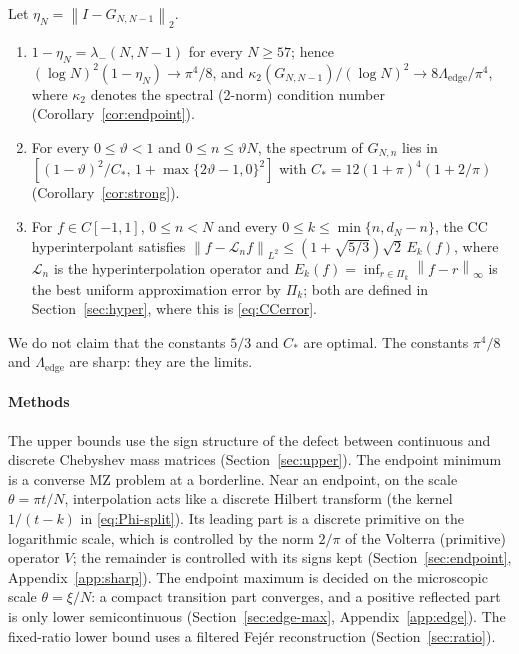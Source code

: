 \documentclass{siamart251216}
\newcommand{\Pn}{\Pi}
\newcommand{\norm}[1]{\left\lVert#1\right\rVert}
\begin{document}
\begin{corollary}\label{cor:intro}
Let $\eta_N=\norm{I-G_{N,N-1}}_2$.
\begin{enumerate}
\item $1-\eta_N=\lambda_-(N,N-1)$ for every $N\ge57$; hence
$(\log N)^2(1-\eta_N)\to\pi^4/8$, and
$\kappa_2(G_{N,N-1})/(\log N)^2\to8\Lambda_{\mathrm{edge}}/\pi^4$,
where $\kappa_2$ denotes the spectral (2-norm) condition number
(Corollary~\ref{cor:endpoint}).
\item For every $0\le\vartheta<1$ and $0\le n\le\vartheta N$, the spectrum of
$G_{N,n}$ lies in $[(1-\vartheta)^2/C_*,\,1+\max\{2\vartheta-1,0\}^2]$ with
$C_*=12(1+\pi)^4(1+2/\pi)$ (Corollary~\ref{cor:strong}).
\item For $f\in C[-1,1]$, $0\le n<N$ and every $0\le k\le\min\{n,d_N-n\}$,
the CC hyperinterpolant satisfies
$\norm{f-\mathcal L_nf}_{L^2}\le(1+\sqrt{5/3})\sqrt2\,E_k(f)$, where
$\mathcal L_n$ is the hyperinterpolation operator and
$E_k(f)=\inf_{r\in\Pn_k}\norm{f-r}_\infty$ is the best uniform
approximation error by $\Pn_k$; both are defined in
Section~\ref{sec:hyper}, where this is \eqref{eq:CCerror}.
\end{enumerate}
\end{corollary}

We do not claim that the constants $5/3$ and $C_*$ are optimal. The
constants $\pi^4/8$ and $\Lambda_{\mathrm{edge}}$ are sharp: they are the
limits.

\paragraph{Methods}
The upper bounds use the sign structure of the defect between continuous and
discrete Chebyshev mass matrices (Section~\ref{sec:upper}). The endpoint
minimum is a converse MZ problem at a borderline. Near an endpoint, on the
scale $\theta=\pi t/N$, interpolation acts like a discrete Hilbert transform
(the kernel $1/(t-k)$ in \eqref{eq:Phi-split}).
Its leading part is a discrete primitive on the logarithmic scale, which is
controlled by the norm $2/\pi$ of the Volterra (primitive) operator $V$; the remainder is
controlled with its signs kept (Section~\ref{sec:endpoint},
Appendix~\ref{app:sharp}). The endpoint maximum is decided on the microscopic
scale $\theta=\xi/N$: a compact transition part converges, and a positive
reflected part is only lower semicontinuous (Section~\ref{sec:edge-max},
Appendix~\ref{app:edge}). The fixed-ratio lower bound uses a filtered
Fej\'er reconstruction (Section~\ref{sec:ratio}).
\end{document}
